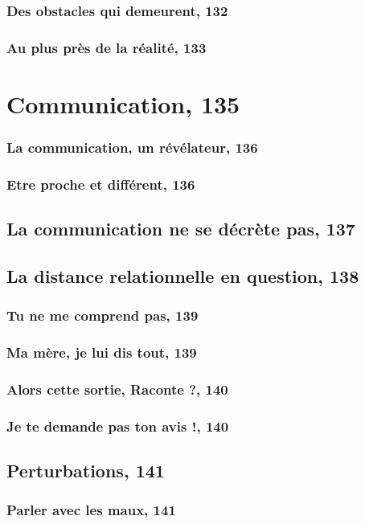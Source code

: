 \documentclass[12pt]{report}
\begin{document}
\begin{itemize}
\subsection{Des obstacles qui demeurent, 132}
\subsection{Au plus près de la réalité, 133}

\chapter{Communication, 135}
\subsection{La communication, un révélateur, 136}
\subsection{Etre proche et différent, 136}
\section{La communication ne se décrète pas, 137}
\section{La distance relationnelle en question, 138}
\subsection{Tu ne me comprend pas, 139}
\subsection{Ma mère, je lui dis tout, 139}
\subsection{Alors cette sortie, Raconte ?, 140}
\subsection{Je te demande pas ton avis !, 140}
\section{Perturbations, 141}
\subsection{Parler avec les maux, 141}

\end{itemize}
\end{document}
